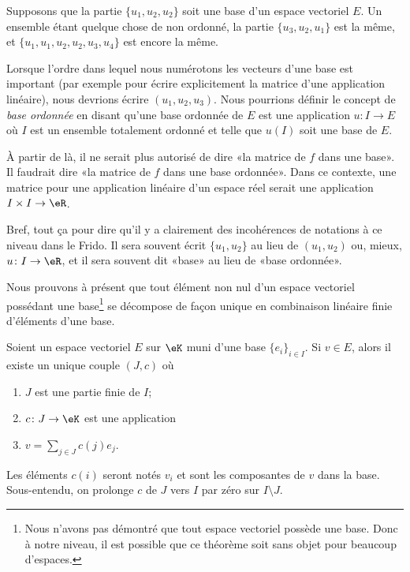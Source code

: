 \begin{normaltext}		\label{NORMooJGRNooAKtvWt}
	Supposons que la partie \( \{ u_1,u_2,u_2 \}\) soit une base d'un espace vectoriel \( E\). Un ensemble étant quelque chose de non ordonné, la partie \( \{ u_3,u_2,u_1 \}\) est la même, et \( \{ u_1,u_1,u_2,u_2,u_3,u_4 \}\) est encore la même.

	Lorsque l'ordre dans lequel nous numérotons les vecteurs d'une base est important (par exemple pour écrire explicitement la matrice d'une application linéaire), nous devrions écrire \( (u_1,u_2,u_3)\). Nous pourrions définir le concept de \emph{base ordonnée} en disant qu'une base ordonnée de \( E\) est une application \(u \colon I\to E  \) où \( I\) est un ensemble totalement ordonné et telle que \( u(I)\) soit une base de \( E\).

	À partir de là, il ne serait plus autorisé de dire «la matrice de \( f\) dans une base». Il faudrait dire «la matrice de \( f\) dans une base ordonnée». Dans ce contexte, une matrice pour une application linéaire d'un espace réel serait une application \( I\times I\to \eR\).

	Bref, tout ça pour dire qu'il y a clairement des incohérences de notations à ce niveau dans le Frido. Il sera souvent écrit \( \{ u_1,u_2 \}\) au lieu de \( (u_1, u_2)\) ou, mieux, \(u \colon I\to \eR  \), et il sera souvent dit «base» au lieu de «base ordonnée».
\end{normaltext}

Nous prouvons à présent que tout élément non nul d'un espace vectoriel possédant une base\footnote{Nous n'avons pas démontré que tout espace vectoriel possède une base. Donc à notre niveau, il est possible que ce théorème soit sans objet pour beaucoup d'espaces.} se décompose de façon unique en combinaison linéaire finie d'éléments d'une base.
\begin{proposition}      \label{PROPooEIQIooXfWDDV}
	Soient un espace vectoriel \( E\) sur \( \eK\) muni d'une base \( \{ e_i \}_{i\in I}\). Si \( v\in E\), alors il existe un unique couple \( (J, c)\) où
	\begin{enumerate}
		\item
		      \( J\) est une partie finie de \( I\);
		\item
		      \( c\colon J\to \eK\) est une application
		\item
		      \( v=\sum_{j\in J}c(j)e_j\).
	\end{enumerate}
	Les éléments \( c(i)\) seront notés \( v_i\) et sont les composantes de \( v\) dans la base. Sous-entendu, on prolonge \( c\) de \( J\)  vers \( I\) par zéro sur \( I\setminus J\).
\end{proposition}

